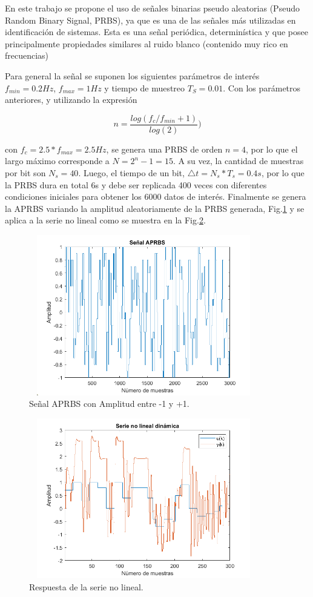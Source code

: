 \documentclass[12pt]{article}
\begin{document}
En este trabajo se propone el uso de señales binarias pseudo aleatorias (Pseudo Random Binary Signal, PRBS),  ya  que  es  una  de  las  señales  más  utilizadas  en  identificación  de sistemas. Esta es una señal periódica, determinística y que  posee  principalmente  propiedades  similares  al  ruido  blanco  (contenido  muy  rico  en frecuencias)

Para general la señal se suponen los siguientes parámetros de interés $f_{min}=0.2 Hz$, $f_{max}=1 Hz$ y tiempo de muestreo $T_S=0.01$. Con los parámetros anteriores, y utilizando la expresión

\begin{equation}
n=\frac{log(f_c/f_{min}+1)}{log(2)})
\label{e_}
\end{equation}

con $f_c=2.5*f_{max}=2.5 Hz$, se genera una PRBS de orden $n= 4$, por lo que el largo máximo corresponde a $N = 2^n - 1 = 15$. A su vez, la cantidad de muestras por bit son $N_{s} = 40$. Luego, el tiempo de un bit, $\triangle t=N_s*T_s=0.4s$, por lo que la PRBS dura en total 6s y debe ser replicada 400 veces con diferentes condiciones iniciales para obtener los 6000 datos de interés. Finalmente se genera la APRBS variando la amplitud aleatoriamente de la PRBS generada, Fig.\ref{f_APRBS} y se aplica a la serie no lineal como se muestra en la Fig.\ref{f_SerieNoLineal}.

\begin{figure}
\centering
\includegraphics[width=10cm,height=7cm]{imag/APRBS}
\caption{Señal APRBS con Amplitud entre -1 y +1.}
\label{f_APRBS}
\end{figure}

\begin{figure}
\centering
\includegraphics[width=10cm,height=7cm]{imag/SerieNoLineal}
\caption{Respuesta de la serie no lineal.}
\label{f_SerieNoLineal}
\end{figure}
\end{document}
